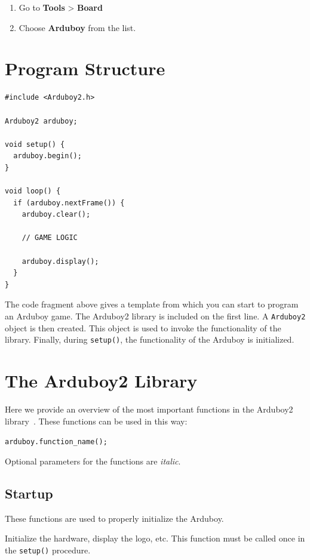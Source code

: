 \documentclass[11pt,fleqn]{book} %
\begin{document}
\begin{enumerate}
	\item Go to \textbf{Tools} > \textbf{Board}
	\item Choose \textbf{Arduboy} from the list.
\end{enumerate}


\section{Program Structure}

\begin{verbatim}
#include <Arduboy2.h>

Arduboy2 arduboy;

void setup() {
  arduboy.begin();
}

void loop() {
  if (arduboy.nextFrame()) {
    arduboy.clear();

    // GAME LOGIC

    arduboy.display();
  }
}
\end{verbatim}
\noindent
The code fragment above gives a template from which you can start to program an Arduboy game. The Arduboy2 library is included on the first line. A \texttt{Arduboy2} object is then created. This object is used to invoke the functionality of the library. Finally, during \texttt{setup()}, the functionality of the Arduboy is initialized.

\section{The Arduboy2 Library}
Here we provide an overview of the most important functions in the Arduboy2 library~\cite{arduboy:lib2-doc}. These functions can be used in this way:

\begin{center}
	\texttt{arduboy.function\_name();}
\end{center}
\noindent
Optional parameters for the functions are \emph{italic}.

\subsection{Startup}
These functions are used to properly initialize the Arduboy.

\begin{libf}[begin()]
	Initialize the hardware, display the logo, etc. This function must be called once in the \texttt{setup()} procedure.
\end{libf}
\end{document}
